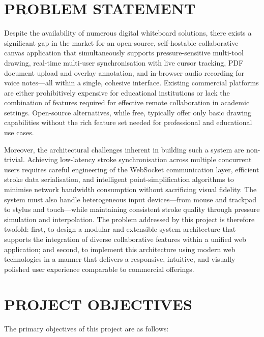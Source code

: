 \documentclass[12pt,a4paper]{report}
\begin{document}
\section{PROBLEM STATEMENT}

Despite the availability of numerous digital whiteboard solutions, there exists a significant gap in the market for an open-source, self-hostable collaborative canvas application that simultaneously supports pressure-sensitive multi-tool drawing, real-time multi-user synchronisation with live cursor tracking, PDF document upload and overlay annotation, and in-browser audio recording for voice notes---all within a single, cohesive interface. Existing commercial platforms are either prohibitively expensive for educational institutions or lack the combination of features required for effective remote collaboration in academic settings. Open-source alternatives, while free, typically offer only basic drawing capabilities without the rich feature set needed for professional and educational use cases.

Moreover, the architectural challenges inherent in building such a system are non-trivial. Achieving low-latency stroke synchronisation across multiple concurrent users requires careful engineering of the WebSocket communication layer, efficient stroke data serialisation, and intelligent point-simplification algorithms to minimise network bandwidth consumption without sacrificing visual fidelity. The system must also handle heterogeneous input devices---from mouse and trackpad to stylus and touch---while maintaining consistent stroke quality through pressure simulation and interpolation. The problem addressed by this project is therefore twofold: first, to design a modular and extensible system architecture that supports the integration of diverse collaborative features within a unified web application; and second, to implement this architecture using modern web technologies in a manner that delivers a responsive, intuitive, and visually polished user experience comparable to commercial offerings.

\section{PROJECT OBJECTIVES}

The primary objectives of this project are as follows:
\end{document}

